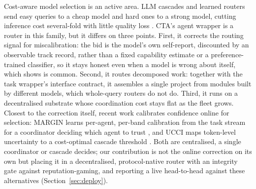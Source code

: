 \documentclass[11pt]{article}
\begin{document}
Cost-aware model selection is an active area. LLM cascades and learned routers send easy queries to a cheap model and hard ones to a strong model, cutting inference cost several-fold with little quality loss \citep{chen2023frugalgpt,ong2024routellm,ding2025bestroute}. CTA's agent wrapper is a router in this family, but it differs on three points. First, it corrects the routing signal for miscalibration: the bid is the model's own self-report, discounted by an observable track record, rather than a fixed capability estimate or a preference-trained classifier, so it stays honest even when a model is wrong about itself, which \citet{fradkin2026marketbench} shows is common. Second, it routes decomposed work: together with the task wrapper's interface contract, it assembles a single project from modules built by different models, which whole-query routers do not do. Third, it runs on a decentralised substrate whose coordination cost stays flat as the fleet grows. Closest to the correction itself, recent work calibrates confidence online for selection: MARGIN learns per-agent, per-band calibration from the task stream for a coordinator deciding which agent to trust \citep{armstrong2026margin}, and UCCI maps token-level uncertainty to a cost-optimal cascade threshold \citep{kotte2026ucci}. Both are centralised, a single coordinator or cascade decides; our contribution is not the online correction on its own but placing it in a decentralised, protocol-native router with an integrity gate against reputation-gaming, and reporting a live head-to-head against these alternatives (Section~\ref{sec:deploy}).
\end{document}
